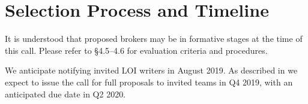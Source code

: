 \documentclass[DM,toc,lsstdraft]{lsstdoc}
\begin{document}
\section{Selection Process and Timeline}

It is understood that proposed brokers may be in formative stages at the time of this call.
Please refer to  \S4.5--4.6 for evaluation criteria and procedures.

We anticipate notifying invited LOI writers in August 2019.
As described in  we expect to issue the call for full proposals to invited teams in Q4 2019, with an anticipated due date in Q2 2020.

%


\end{document}
